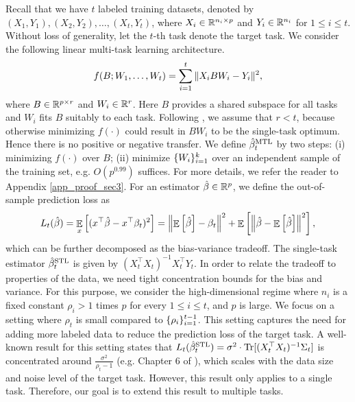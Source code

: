Recall that we have $t$ labeled training datasets, denoted by $(X_1, Y_1), (X_2, Y_2), \dots, (X_t, Y_t)$, where $X_i\in\mathbb{R}^{n_i\times p}$ and $Y_i\in\mathbb{R}^{n_i}$ for $1\le i\le t$.
Without loss of generality, let the $t$-th task denote the target task.
We consider the following linear multi-task learning architecture.
\begin{align}
	\label{eq_mtl}
	f(B; W_1, \dots, W_t) = \sum_{i=1}^t \|X_i B W_i - Y_i\|^2,
\end{align}
where $B\in\mathbb{R}^{p\times r}$ and $W_i\in\mathbb{R}^r$.
Here $B$ provides a shared subspace for all tasks and $W_i$ fits $B$ suitably to each task.
Following \cite{WZR20}, we assume that $r < t$, because otherwise minimizing $f(\cdot)$ could result in $BW_i$ to be the single-task optimum.
Hence there is no positive or negative transfer.
We define $\hat{\beta}_t^{\text{MTL}}$ by two steps:
(i) minimizing $f(\cdot)$ over $B$;
(ii) minimize $\{W_i\}_{i=1}^k$ over an independent sample of the training set, e.g. $O(p^{0.99})$ suffices.
For more details, we refer the reader to Appendix \ref{app_proof_sec3}.
For an estimator $\hat{\beta}\in\mathbb{R}^p$, we define the out-of-sample prediction loss as
	\begin{align*}
		L_t(\hat{\beta}) = \mathop{\mathbb{E}}_{x}\left[ ({x}^{\top}\hat{\beta} - {x}^{\top}\beta_t)^2 \right]
		= \left\| \mathop{\mathbb{E}}\left[ \hat{\beta} \right] - \beta_t \right\|^2 + \mathop{\mathbb{E}}\left[ \left\| \hat{\beta} - \mathop{\mathbb{E}}\left[ \hat{\beta} \right] \right\|^2 \right],
	\end{align*}
which can be further decomposed as the bias-variance tradeoff.
The single-task estimator $\hat{\beta}_t^{\text{STL}}$ is given by $(X_t^{\top}X_t)^{-1}X_t^{\top}Y_t$.
In order to relate the tradeoff to properties of the data, we need tight concentration bounds for the bias and variance.
For this purpose, we consider the high-dimensional regime where $n_i$ is a fixed constant $\rho_i > 1$ times $p$ for every $1\le i\le t$, and $p$ is large.
We focus on a setting where $\rho_t$ is small compared to $\{\rho_i\}_{i=1}^{t-1}$.
This setting captures the need for adding more labeled data to reduce the prediction loss of the target task.
A well-known result for this setting states that $L_t(\hat{\beta}_t^{\text{STL}}) = \sigma^2 \cdot \operatorname{Tr}[(X_t^{\top}X_t)^{-1}\Sigma_t]$ is concentrated around $\frac {\sigma^2} {\rho_t - 1}$ (e.g. Chapter 6 of \cite{S07}), which scales with the data size and noise level of the target task.
However, this result only applies to a single task.
Therefore, our goal is to extend this result to multiple tasks.

